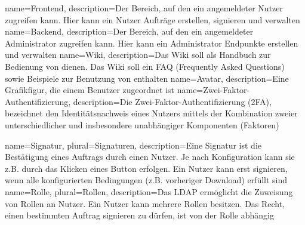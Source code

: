 {
	name=Frontend,
	description={Der Bereich, auf den ein angemeldeter Nutzer zugreifen kann. Hier kann ein Nutzer Aufträge erstellen, signieren und verwalten}
}
{
	name=Backend,
	description={Der Bereich, auf den ein angemeldeter Administrator zugreifen kann. Hier kann ein Administrator Endpunkte erstellen und verwalten}
}
{
	name=Wiki,
	description={Das Wiki soll als Handbuch zur Bedienung von \name dienen. Das Wiki soll ein FAQ (Frequently Asked Questions) sowie Beispiele zur Benutzung von \name enthalten}
}
{
	name=Avatar,
	description={Eine Grafikfigur, die einem Benutzer zugeordnet ist}
}
{
	name=Zwei-Faktor-Authentifizierung,
	description={Die Zwei-Faktor-Authentifizierung (2FA), bezeichnet den Identitätsnachweis eines Nutzers mittels der Kombination zweier unterschiedlicher und insbesondere unabhängiger Komponenten (Faktoren)}
}

{
	name=Signatur,
	plural=Signaturen,
	description={Eine Signatur ist die Bestätigung eines Auftrags durch einen Nutzer. Je nach Konfiguration kann sie z.B. durch das Klicken eines Button erfolgen. Ein Nutzer kann erst signieren, wenn alle konfigurierten Bedingungen (z.B. vorheriger Download) erfüllt sind}
}
{
	name=Rolle,
	plural=Rollen,
	description={Das LDAP ermöglicht die Zuweisung von Rollen an Nutzer. Ein Nutzer kann mehrere Rollen besitzen.
	Das Recht, einen bestimmten Auftrag signieren zu dürfen, ist von der Rolle abhängig}
}

